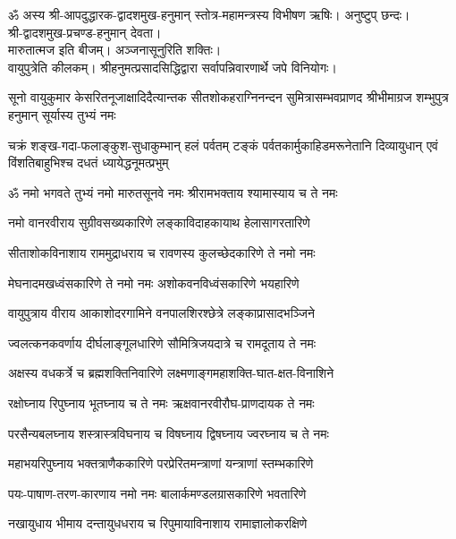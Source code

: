 
ॐ अस्य श्री-आपदुद्धारक-द्वादशमुख-हनुमान् स्तोत्र-महामन्त्रस्य विभीषण ऋषिः। अनुष्टुप् छन्दः।\\
श्री-द्वादशमुख-प्रचण्ड-हनुमान् देवता।\\
 मारुतात्मज इति बीजम्। अञ्जनासूनुरिति शक्तिः।\\
वायुपुत्रेति कीलकम्। श्रीहनुमत्प्रसादसिद्धिद्वारा सर्वापन्निवारणार्थे जपे विनियोगः।

{सूनो वायुकुमार केसरितनूजाक्षादिदैत्यान्तक}
{सीतशोकहराग्निनन्दन सुमित्रासम्भवप्राणद}
{श्रीभीमाग्रज शम्भुपुत्र हनुमान् सूर्यास्य तुभ्यं नमः}

{चक्रं शङ्ख-गदा-फलाङ्कुश-सुधाकुम्भान् हलं पर्वतम्}
{टङ्कं पर्वतकार्मुकाहिडमरूनेतानि दिव्यायुधान्}
{एवं विंशतिबाहुभिश्च दधतं ध्यायेद्धनूमत्प्रभुम्}


\twolineshloka
{ॐ नमो भगवते तुभ्यं नमो मारुतसूनवे}
{नमः श्रीरामभक्ताय श्यामास्याय च ते नमः}

\twolineshloka
{नमो वानरवीराय सुग्रीवसख्यकारिणे}
{लङ्काविदाहकायाथ हेलासागरतारिणे}

\twolineshloka
{सीताशोकविनाशाय राममुद्राधराय च}
{रावणस्य कुलच्छेदकारिणे ते नमो नमः}

\twolineshloka
{मेघनादमखध्वंसकारिणे ते नमो नमः}
{अशोकवनविध्वंसकारिणे भयहारिणे}

\twolineshloka
{वायुपुत्राय वीराय आकाशोदरगामिने}
{वनपालशिरश्छेत्रे लङ्काप्रासादभञ्जिने}

\twolineshloka
{ज्वलत्कनकवर्णाय दीर्घलाङ्गूलधारिणे}
{सौमित्रिजयदात्रे च रामदूताय ते नमः}

\twolineshloka
{अक्षस्य वधकर्त्रे च ब्रह्मशक्तिनिवारिणे}
{लक्ष्मणाङ्गमहाशक्ति-घात-क्षत-विनाशिने}

\twolineshloka
{रक्षोघ्नाय रिपुघ्नाय भूतघ्नाय च ते नमः}
{ऋक्षवानरवीरौघ-प्राणदायक ते नमः}

\twolineshloka
{परसैन्यबलघ्नाय शस्त्रास्त्रविघनाय च}
{विषघ्नाय द्विषघ्नाय ज्वरघ्नाय च ते नमः}

\twolineshloka
{महाभयरिपुघ्नाय भक्तत्राणैककारिणे}
{परप्रेरितमन्त्राणां यन्त्राणां स्तम्भकारिणे}

\twolineshloka
{पयः-पाषाण-तरण-कारणाय नमो नमः}
{बालार्कमण्डलग्रासकारिणे भवतारिणे}

\twolineshloka
{नखायुधाय भीमाय दन्तायुधधराय च}
{रिपुमायाविनाशाय रामाज्ञालोकरक्षिणे}


